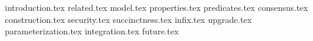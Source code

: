 {introduction.tex}
{related.tex}
{model.tex}
{properties.tex}
{predicates.tex}
{consensus.tex}
{construction.tex}
{security.tex}
{succinctness.tex}
{infix.tex}
{upgrade.tex}
{parameterization.tex}
{integration.tex}
{future.tex}
